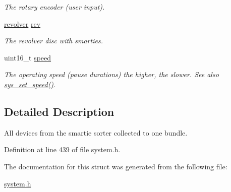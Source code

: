 \begin{CompactItemize}
\begin{CompactList}\small\item\em The rotary encoder (user input). \item\end{CompactList}\item 
\hypertarget{structsmartie__sorter__t_94a0cc186fb2a8ca66bfcae1c341a0bb}{
\hyperlink{structrevolver__t}{revolver} \hyperlink{structsmartie__sorter__t_94a0cc186fb2a8ca66bfcae1c341a0bb}{rev}}
\label{structsmartie__sorter__t_94a0cc186fb2a8ca66bfcae1c341a0bb}

\begin{CompactList}\small\item\em The revolver disc with smarties. \item\end{CompactList}\item 
\hypertarget{structsmartie__sorter__t_dd43953759e4028e7eae83127ce6c98b}{
uint16\_\-t \hyperlink{structsmartie__sorter__t_dd43953759e4028e7eae83127ce6c98b}{speed}}
\label{structsmartie__sorter__t_dd43953759e4028e7eae83127ce6c98b}

\begin{CompactList}\small\item\em The operating speed (pause durations) the higher, the slower. See also \hyperlink{system_8c_5ac3b5cf6f06e3ff4d3c745f9d5c693a}{sys\_\-set\_\-speed()}. \item\end{CompactList}\end{CompactItemize}


\subsection{Detailed Description}
All devices from the smartie sorter collected to one bundle. 

Definition at line 439 of file system.h.

The documentation for this struct was generated from the following file:\begin{CompactItemize}
\item 
\hyperlink{system_8h}{system.h}\end{CompactItemize}
